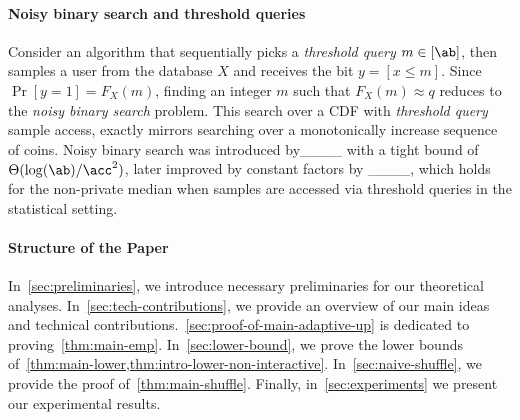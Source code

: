\paragraph{Noisy binary search and threshold queries} Consider an algorithm that sequentially picks a \textit{threshold query} $m\in[\ab]$, then samples a user from the database $X$ and receives the bit $y=[x\leq m]$. Since $\Pr[y = 1] = F_X(m)$, finding an integer $m$ such that $F_X(m) \approx q$ reduces to the \textit{noisy binary search} problem. This search over a CDF with \textit{threshold query} sample access, exactly mirrors searching over a monotonically increase sequence of coins. Noisy binary search was introduced by____ with a tight bound of $\Theta(\log(\ab)/\acc^2)$, later improved by constant factors by ____, which holds for the non-private median when samples are accessed via threshold queries in the statistical setting. 

%

%
%
%
%

%
%

%


\paragraph{Structure of the Paper}
In~\cref{sec:preliminaries}, we introduce necessary preliminaries for our theoretical analyses. In~\cref{sec:tech-contributions}, we provide an overview of our main ideas and technical contributions.~\cref{sec:proof-of-main-adaptive-up} is dedicated to proving~\cref{thm:main-emp}. In~\cref{sec:lower-bound}, we prove the lower bounds of~\cref{thm:main-lower,thm:intro-lower-non-interactive}. In~\cref{sec:naive-shuffle}, we provide the proof of~\cref{thm:main-shuffle}. Finally, in~\cref{sec:experiments} we present our experimental results.